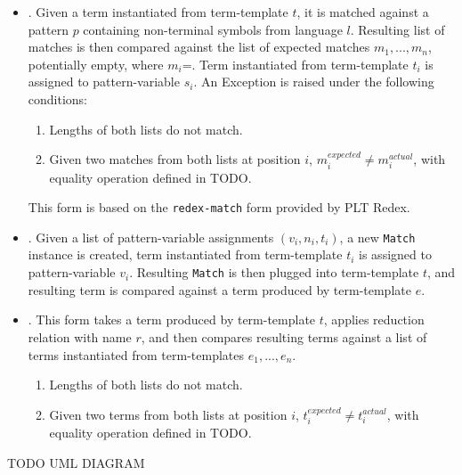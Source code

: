 \begin{itemize}
\item \RedexMatchAssertEqual. Given a term instantiated from term-template $t$, it is matched against a pattern $p$ containing non-terminal symbols from language $l$. Resulting list of matches is then compared against the list of expected matches $m_1,...,m_n$, potentially empty, where $m_i$=\Match. Term instantiated from term-template $t_i$ is assigned to pattern-variable $s_i$. An Exception is raised under the following conditions:
	\begin{enumerate}
	\item Lengths of both lists do not match.
	\item Given two matches from both lists at position $i$, $m_i^{expected} \neq m_i^{actual}$, with equality operation defined in TODO.
	\end{enumerate}
	This form is based on the \texttt{redex-match} form provided by PLT Redex.

\item \TermLetAssertEqual. Given a list of pattern-variable assignments $(v_i, n_i, t_i)$, a new \texttt{Match} instance is created, term instantiated from term-template $t_i$ is assigned to pattern-variable $v_i$. Resulting \texttt{Match} is then plugged into term-template $t$, and resulting term is compared against a term produced by term-template $e$.

\item \ApplyReductionRelationAssertEqual. This form takes a term produced by term-template $t$, applies reduction relation with name $r$, and then compares resulting terms against a list of terms instantiated from term-templates $e_1,...,e_n$.
	\begin{enumerate}
	\item Lengths of both lists do not match.
	\item Given two terms from both lists at position $i$, $t_i^{expected} \neq t_i^{actual}$, with equality operation defined in TODO.
	\end{enumerate}
\end{itemize}

TODO UML DIAGRAM

